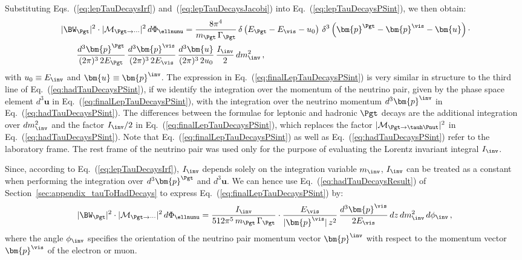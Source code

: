 Substituting Eqs.~(\ref{eq:lepTauDecaysIrf})
and~(\ref{eq:lepTauDecaysJacobi}) into
Eq.~(\ref{eq:lepTauDecaysPSint}), we then obtain:
\begin{align}
& \, \vert \BW_{\Pgt} \vert^{2} \cdot \vert\mathcal{M}_{\Pgt\to\cdots}\vert^{2} \,
 d\Phi_{\ellnunu} = \frac{8\pi^{4}}{m_{\Pgt} \, \Gamma_{\Pgt}} \,
 \delta \left( E_{\Pgt} - E_{\vis} - u_{0} \right)
 \, \delta^{3} \left( \bm{p}^{\Pgt} - \bm{p}^{\vis} -
  \bm{u} \right) \cdot \nonumber \\
& \qquad \frac{d^{3}\bm{p}^{\Pgt}}{(2\pi)^{3} \, 2 E_{\Pgt}} \,
  \frac{d^{3}\bm{p}^{\vis}}{(2\pi)^{3} \, 2 E_{\vis}} \, 
  \frac{d^{3}\bm{u}}{(2\pi)^{3} \, 2 u_{0}} \, \frac{I_{\inv}}{2} \,
  dm^{2}_{\inv} \, ,
\label{eq:finalLepTauDecaysPSint}
\end{align}
with $u_{0} \equiv E_{\inv}$ and $\bm{u} \equiv \bm{p}^{\inv}$.
The expression in Eq.~(\ref{eq:finalLepTauDecaysPSint}) is very similar in structure to the third line of Eq.~(\ref{eq:hadTauDecaysPSint}),
if we identify the integration over the momentum of the neutrino pair,
given by the phase space element $d^{3}\bm{u}$ in Eq.~(\ref{eq:finalLepTauDecaysPSint}), 
with the integration over the neutrino momentum $d^{3}\bm{p}^{\inv}$ in Eq.~(\ref{eq:hadTauDecaysPSint}).
The differences between the formulae for leptonic and hadronic $\Pgt$ decays
are the additional integration over $dm^{2}_{\inv}$ and the
factor $I_{\inv}/2$ in Eq.~(\ref{eq:finalLepTauDecaysPSint}), which replaces the
factor $\vert\mathcal{M}_{\Pgt \to
  \tauh\Pnut}\vert^{2}$ in Eq.~(\ref{eq:hadTauDecaysPSint}).
Note that Eq.~(\ref{eq:finalLepTauDecaysPSint}) as well as Eq.~(\ref{eq:hadTauDecaysPSint}) refer to the laboratory frame.
The rest frame of the neutrino pair was used only for the purpose of evaluating the Lorentz invariant integral $I_{\inv}$.

Since, according to Eq.~(\ref{eq:lepTauDecaysIrf}), $I_{\inv}$ 
depends solely on the integration variable $m_{\inv}$, 
$I_{\inv}$ can be treated as a constant when performing the integration over $d^{3}\bm{p}^{\Pgt}$ and $d^{3}\bm{u}$.
We can hence use Eq.~(\ref{eq:hadTauDecaysResult}) of Section~\ref{sec:appendix_tauToHadDecays} to express Eq.~(\ref{eq:finalLepTauDecaysPSint}) by:
\begin{align}
\vert \BW_{\Pgt} \vert^{2} \cdot \vert\mathcal{M}_{\Pgt\to\cdots}\vert^{2} \,
 d\Phi_{\ellnunu} = \frac{I_{\inv}}{512\pi^{5}\, m_{\Pgt} \, \Gamma_{\Pgt}} \cdot 
    \frac{E_{\vis}}{\vert\bm{p}^{\vis}\vert \, z^{2}} \, 
    \frac{d^{3}\bm{p}^{\vis}}{2 E_{\vis}} \, dz \, dm^{2}_{\inv} \,
    d\phi_{\inv} \, ,
\label{eq:lepTauDecaysResult}
\end{align}
where the angle $\phi_{\inv}$ specifies the orientation of the neutrino
pair momentum vector $\bm{p}^{\inv}$ with respect to the momentum vector $\bm{p}^{\vis}$
of the electron or muon.

